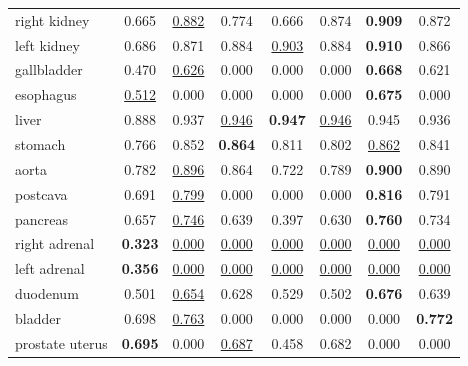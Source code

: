\begin{minipage}{\textwidth}
{\begin{tabular}{@{}lccccccc@{}}
right kidney & 0.665 & \underline{0.882} & 0.774 & 0.666 & 0.874 & \textbf{0.909} & 0.872 \\
left kidney & 0.686 & 0.871 & 0.884 & \underline{0.903} & 0.884 & \textbf{0.910} & 0.866 \\
gallbladder & 0.470 & \underline{0.626} & 0.000 & 0.000 & 0.000 & \textbf{0.668} & 0.621 \\
esophagus & \underline{0.512} & 0.000 & 0.000 & 0.000 & 0.000 & \textbf{0.675} & 0.000 \\
liver & 0.888 & 0.937 & \underline{0.946} & \textbf{0.947} & \underline{0.946} & 0.945 & 0.936 \\
stomach & 0.766 & 0.852 & \textbf{0.864} & 0.811 & 0.802 & \underline{0.862} & 0.841 \\
aorta & 0.782 & \underline{0.896} & 0.864 & 0.722 & 0.789 & \textbf{0.900} & 0.890 \\
postcava & 0.691 & \underline{0.799} & 0.000 & 0.000 & 0.000 & \textbf{0.816} & 0.791 \\
pancreas & 0.657 & \underline{0.746} & 0.639 & 0.397 & 0.630 & \textbf{0.760} & 0.734 \\
right adrenal & \textbf{0.323} & \underline{0.000} & \underline{0.000} & \underline{0.000} & \underline{0.000} & \underline{0.000} & \underline{0.000} \\
left adrenal & \textbf{0.356} & \underline{0.000} & \underline{0.000} & \underline{0.000} & \underline{0.000} & \underline{0.000} & \underline{0.000} \\
duodenum & 0.501 & \underline{0.654} & 0.628 & 0.529 & 0.502 & \textbf{0.676} & 0.639 \\
bladder & 0.698 & \underline{0.763} & 0.000 & 0.000 & 0.000 & 0.000 & \textbf{0.772} \\
prostate uterus & \textbf{0.695} & 0.000 & \underline{0.687} & 0.458 & 0.682 & 0.000 & 0.000 \\
\bottomrule
\end{tabular}
}\end{minipage}
\par\bigskip
